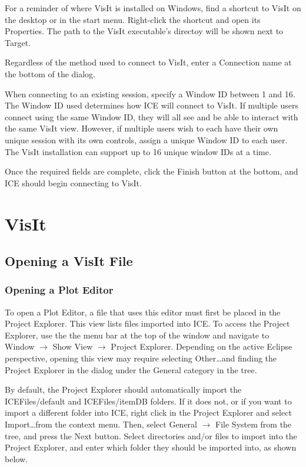 \documentclass{article}
\begin{document}
For a reminder of where VisIt is installed on Windows, find a shortcut to
VisIt on the desktop or in the start menu. Right-click the shortcut and open its
Properties. The path to the VisIt executable's directoy will be shown next to
Target.

Regardless of the method used to connect to VisIt, enter a Connection
name at the bottom of the dialog. 

When connecting to an existing session, specify a Window ID between 1 and 16.
The Window ID used determines how ICE will connect to VisIt. If multiple users
connect using the same Window ID, they will all see and be able to interact with
the same VisIt view. However, if multiple users wish to each have their own
unique session with its own controls, assign a unique Window ID to each user.
The VisIt installation can support up to 16 unique window IDs at a time.

Once the required fields are complete, click the Finish button at the bottom,
and ICE should begin connecting to VisIt.

\section{VisIt}

\subsection{Opening a VisIt File}

\subsubsection{Opening a Plot Editor} 

To open a Plot Editor, a file that uses this editor must first be placed in the
Project Explorer. This view lists files imported into ICE. To access the Project
Explorer, use the the menu bar at the top of the window and navigate to Window
$\rightarrow$ Show View $\rightarrow$ Project Explorer. Depending on the active
Eclipse perspective, opening this view may require selecting Other\ldots and
finding the Project Explorer in the dialog under the General category in the
tree.

By default, the Project Explorer should automatically import the
ICEFiles/default and ICEFiles/itemDB folders. If it does not, or if you want to
import a different folder into ICE, right click in the Project Explorer and
select Import\ldots from the context menu. Then, select General $\rightarrow$
File System from the tree, and press the Next button. Select directories and/or
files to import into the Project Explorer, and enter which folder they should
be imported into, as shown below.
\end{document}

